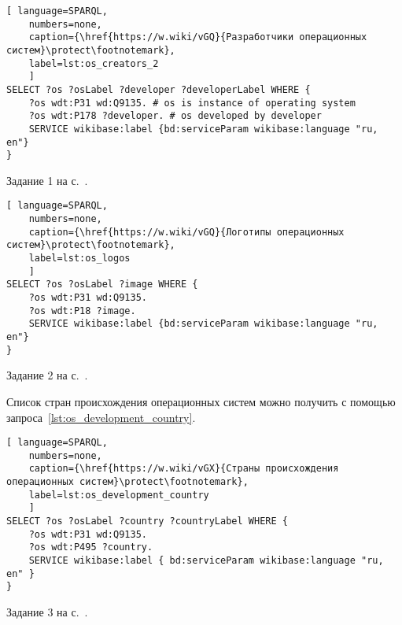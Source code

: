 \newpage
\begin{task}
	\label{answer:os_and_developers}

\begin{lstlisting}[ language=SPARQL, 
    numbers=none,
    caption={\href{https://w.wiki/vGQ}{Разработчики операционных систем}\protect\footnotemark},
    label=lst:os_creators_2
	]
SELECT ?os ?osLabel ?developer ?developerLabel WHERE {
    ?os wdt:P31 wd:Q9135. # os is instance of operating system
    ?os wdt:P178 ?developer. # os developed by developer
    SERVICE wikibase:label {bd:serviceParam wikibase:language "ru, en"}
}\end{lstlisting}

\small{\AnswerBackref Задание 1 на с.~\pageref{tasks:operating_system_tasks}.}
\end{task}


\begin{task}
\label{answer:os_and_logos}

\begin{lstlisting}[ language=SPARQL, 
    numbers=none,
    caption={\href{https://w.wiki/vGQ}{Логотипы операционных систем}\protect\footnotemark},
    label=lst:os_logos
	]
SELECT ?os ?osLabel ?image WHERE {
    ?os wdt:P31 wd:Q9135.
    ?os wdt:P18 ?image.
    SERVICE wikibase:label {bd:serviceParam wikibase:language "ru, en"}
}\end{lstlisting}

\small{\AnswerBackref Задание 2 на с.~\pageref{tasks:operating_system_tasks}.}
\end{task}

\begin{task}
\label{answer:os_country}
Список стран происхождения операционных систем можно получить с помощью запроса~\ref{lst:os_development_country}.

\begin{lstlisting}[ language=SPARQL, 
    numbers=none,
    caption={\href{https://w.wiki/vGX}{Страны происхождения операционных систем}\protect\footnotemark},
	label=lst:os_development_country
	]
SELECT ?os ?osLabel ?country ?countryLabel WHERE {
	?os wdt:P31 wd:Q9135.
	?os wdt:P495 ?country.
	SERVICE wikibase:label { bd:serviceParam wikibase:language "ru, en" }
}\end{lstlisting}

\small{\AnswerBackref Задание 3 на с.~\pageref{tasks:operating_system_tasks}.}
\end{task}





